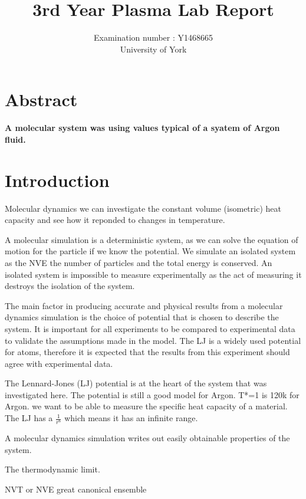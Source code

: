 \documentclass[a4paper, oneside 12pt]{article}
\begin{document}
	
\title{3rd Year Plasma Lab Report}	
\author{Examination number : Y1468665 \\ University of York}
\maketitle

\begin{addmargin}[-3em]{-3em}

\section*{Abstract}
\textbf{ A molecular system was using values typical of a syatem of Argon fluid.}


\newpage
\section{Introduction}

Molecular dynamics we can investigate the constant volume (isometric) heat capacity and see how it reponded to changes in temperature.

A molecular simulation is a deterministic system, as we can solve the equation of motion for the particle if we know the potential. We simulate an isolated system as the NVE the number of particles and the total energy is conserved. An isolated system is impossible to measure experimentally as the act of measuring it destroys the isolation of the system. 

The main factor in producing accurate and physical results from a molecular dynamics simulation is the choice of potential that is chosen to describe the system. It is important for all experiments to be compared to experimental data to validate the assumptions made in the model. The LJ is a widely used potential for atoms, therefore it is expected that the results from this experiment should agree with experimental data. 

The Lennard-Jones (LJ) potential is at the heart of the system that was investigated here. The potential is still a good model for Argon. T*=1 is 120k for Argon. we want to be able to measure the specific heat capacity of a material. The LJ has a $\frac{1}{r^6}$ which means it has an infinite range. 

A molecular dynamics simulation writes out easily obtainable properties of the system.


The thermodynamic limit.


NVT or NVE great canonical ensemble 


\end{addmargin}
\end{document}
